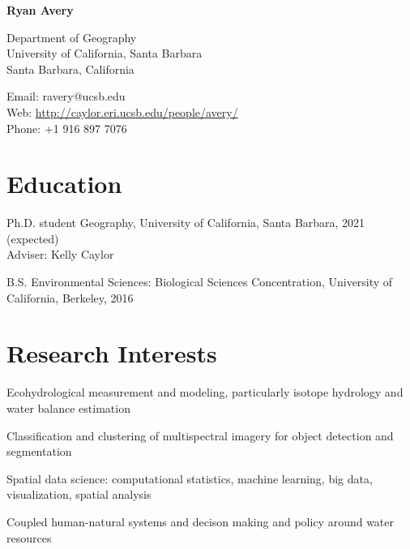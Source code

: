 \documentclass[12pt,letterpaper]{report}
\newcommand{\myname}{Ryan Avery}
\newcommand{\namefont}[1]{{\normalfont\bfseries\Huge{#1}}}
\newcommand{\listitemspace}{0.15em}
\renewenvironment{itemize}
{\begin{list}{}{\setlength{\leftmargin}{0em}
			\setlength{\parskip}{0em}
			\setlength{\itemsep}{\listitemspace}
			\setlength{\parsep}{\listitemspace}}}
	{\end{list}}
\begin{document}
	\raggedright
	
	\namefont{\myname}
	
	\vspace{1em}
	\begin{minipage}[t]{0.495\textwidth}
		Department of Geography \\
		University of California, Santa Barbara \\
		Santa Barbara, California
	\end{minipage}
	\begin{minipage}[t]{0.495\textwidth}
		Email: ravery@ucsb.edu \\
		Web: \href{http://caylor.eri.ucsb.edu/people/avery/}{http://caylor.eri.ucsb.edu/people/avery/} \\
		Phone: +1 916 897 7076
	\end{minipage}
	\vspace{0.5em}
	
	
	
	\section*{Education}
	
	\begin{tablist}
		
		\item[Ph.D. student] \tab Geography, University of California, Santa Barbara, 2021 (expected) \\
		Adviser: Kelly Caylor 
		
		\item[B.S.]  \tab Environmental Sciences: Biological Sciences Concentration, University of California, Berkeley, 2016
		
	\end{tablist}	


	
	\section*{Research Interests}
	
	\begin{itemize}
		
		\item Ecohydrological measurement and modeling, particularly isotope hydrology and water balance estimation
		
		\item Classification and clustering of multispectral imagery for object detection and segmentation
		
		\item Spatial data science: computational statistics, machine learning, big data, visualization, spatial analysis
		
		\item Coupled human-natural systems and decison making and policy around water resources 
		
	\end{itemize}
	
\end{document}
